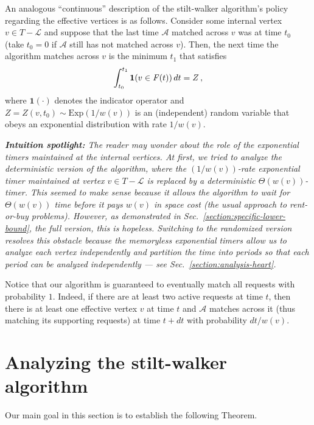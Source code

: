 \documentclass[11pt]{article}
\def\LongVersion{}
\def\LongVersionEnd{}
\def\ShortVersion{}
\def\ShortVersionEnd{}
\theoremstyle{definition}
\theoremstyle{plain}
\theoremstyle{definition}
\theoremstyle{plain}
\theoremstyle{definition}
\theoremstyle{plain}
\newenvironment{MathMaybe}[0]
{\begin{displaymath}\ignorespaces}
{\end{displaymath}\ignorespacesafterend}
\newenvironment{MathMaybe}[0]
{\begin{math}\ignorespaces}
{\end{math}}
\newenvironment{IntuitionSpotlight}[0]
{\par%
\setlength{\leftskip}{0.5\parindent}%
\setlength{\rightskip}{0.5\parindent}%
\noindent\itshape\textbf{Intuition spotlight:}}
{\par\ignorespacesafterend}
\newcommand{\Sect}{Sec.}
\newcommand{\Leaves}{\mathcal{L}}
\newcommand{\Indicator}{\mathbf{1}}
\newcommand{\ExpDist}{\mathrm{Exp}}
\newcommand{\Effective}{\mathit{F}}
\newcommand{\A}{\mathcal{A}}
\begin{document}
\LongVersion %
\PseudocodeStiltWalker{}
\LongVersionEnd %

An analogous ``continuous'' description of the stilt-walker algorithm's policy
regarding the effective vertices is as follows.
Consider some internal vertex $v \in T - \Leaves$ and suppose that the last
time $\A$ matched across $v$ was at time $t_{0}$ (take
$t_{0} = 0$
if $\A$ still has not matched across $v$).
Then, the next time the algorithm matches across $v$ is the minimum $t_{1}$
that satisfies
\begin{MathMaybe}
\int_{t_{0}}^{t_{1}} \Indicator(v \in \Effective(t)) \, d t
=
Z \, ,
\end{MathMaybe}
where
$\Indicator(\cdot)$
denotes the indicator operator and
$Z = Z(v, t_{0}) \sim \ExpDist(1 / w(v))$
is an (independent) random variable that obeys an exponential distribution
with rate $1 / w(v)$.

\begin{IntuitionSpotlight}
The reader may wonder about the role of the exponential timers maintained at
the internal vertices.
At first, we tried to analyze the deterministic version of the algorithm,
where the $(1 / w(v))$-rate exponential timer maintained at vertex $v \in T -
\Leaves$ is replaced by a deterministic $\Theta (w(v))$-timer.
This seemed to make sense because it allows the algorithm to wait for $\Theta
(w(v))$ time before it pays $w(v)$ in space cost (the usual approach to
rent-or-buy problems).
However, as demonstrated in
\LongVersion %
\Sect{}~\ref{section:specific-lower-bound},
\LongVersionEnd %
%
\ShortVersion %
the full version,
\ShortVersionEnd %
%
this is hopeless.
Switching to the randomized version resolves this obstacle because the
memoryless exponential timers allow us to analyze each vertex independently
and partition the time into periods so that each period can be analyzed
independently --- see \Sect{}~\ref{section:analysis-heart}.
\end{IntuitionSpotlight}

Notice that our algorithm is guaranteed to eventually match all requests with
probability $1$.
Indeed, if there are at least two active requests at time $t$, then there is
at least one effective vertex $v$ at time $t$ and $\A$ matches across it (thus
matching its supporting requests) at time $t + d t$ with probability $d t /
w(v)$.

\section{Analyzing the stilt-walker algorithm}
\label{section:analysis}
Our main goal in this section is to establish the following Theorem.
\end{document}
